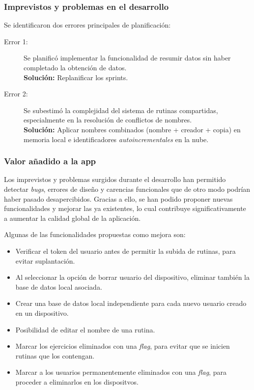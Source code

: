 \subsubsection*{Imprevistos y problemas en el desarrollo}
Se identificaron dos errores principales de planificaci\'on:

\begin{description}
  \item[Error 1:] Se planific\'o implementar la funcionalidad de resumir datos sin haber completado la obtenci\'on de datos. \\ \textbf{Soluci\'on:} Replanificar los sprints.
  \item[Error 2:] Se subestim\'o la complejidad del sistema de rutinas compartidas, especialmente en la resoluci\'on de conflictos de nombres. \\ \textbf{Soluci\'on:} Aplicar nombres combinados (nombre + creador + copia) en memoria local e identificadores \textit{autoincrementales} en la nube.
\end{description}

\subsubsection*{Valor a\~nadido a la app}
Los imprevistos y problemas surgidos durante el desarrollo han permitido detectar \textit{bugs}, errores de dise\~no y carencias funcionales que de otro modo podr\'ian haber pasado desapercibidos. Gracias a ello, se han podido proponer nuevas funcionalidades y mejorar las ya existentes, lo cual contribuye significativamente a aumentar la calidad global de la aplicaci\'on.

Algunas de las funcionalidades propuestas como mejora son:

\begin{itemize}
  \item Verificar el token del usuario antes de permitir la subida de rutinas, para evitar suplantación.
  \item Al seleccionar la opci\'on de borrar usuario del dispositivo, eliminar tambi\'en la base de datos local asociada.
  \item Crear una base de datos local independiente para cada nuevo usuario creado en un dispositivo.
  \item Posibilidad de editar el nombre de una rutina.
  \item Marcar los ejercicios eliminados con una \textit{flag}, para evitar que se inicien rutinas que los contengan.
  \item Marcar a los usuarios permanentemente eliminados con una \textit{flag}, para proceder a eliminarlos en los dispositvos.
\end{itemize}

